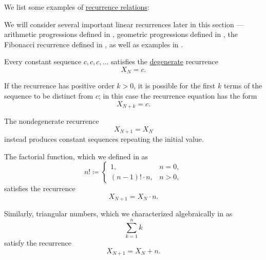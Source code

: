 \begin{example}\label{ex:def:recurrence_relation}
  We list some examples of \hyperref[def:recurrence_relation]{recurrence relations}:
  \begin{thmenum}
     We will consider several important linear recurrences later in this section --- arithmetic progressions defined in , geometric progressions defined in , the Fibonacci recurrence defined in , as well as examples in .

     Every constant sequence \( c, c, c, \ldots \) satisfies the \hyperref[def:recurrence_relation/degenerate]{degenerate} recurrence
    \begin{equation*}
      X_N = c.
    \end{equation*}

    If the recurrence has positive order \( k > 0 \), it is possible for the first \( k \) terms of the sequence to be distinct from \( c \); in this case the recurrence equation has the form
    \begin{equation*}
      X_{N+k} = c.
    \end{equation*}

    The nondegenerate recurrence
    \begin{equation*}
      X_{N+1} = X_N
    \end{equation*}
    instead produces constant sequences repeating the initial value.

     The factorial function, which we defined in  as
    \begin{equation*}
      n! \coloneqq \begin{cases}
        1,                &n = 0, \\
        (n - 1)! \cdot n, &n > 0,
      \end{cases}
    \end{equation*}
    satisfies the recurrence
    \begin{equation*}
      X_{N+1} = X_N \cdot n.
    \end{equation*}

     Similarly, triangular numbers, which we characterized algebraically in  as
    \begin{equation*}
      \sum_{k=1}^n k
    \end{equation*}
    satisfy the recurrence
    \begin{equation*}
      X_{N+1} = X_N + n.
    \end{equation*}


\end{thmenum}
\end{example}
